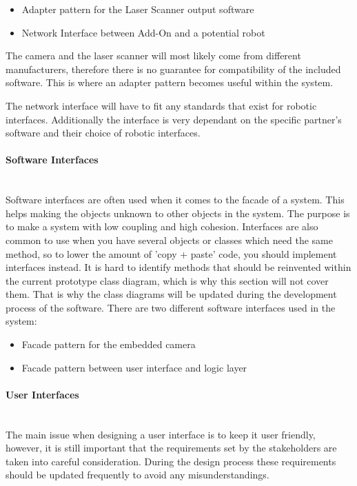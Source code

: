 \begin{itemize}

\item Adapter pattern for the Laser Scanner output software
\item Network Interface between Add-On and a potential robot

\end{itemize}

The camera and the laser scanner will most likely come from different manufacturers, therefore there is no guarantee for compatibility of the included software. This is where an adapter pattern becomes useful within the system.

The network interface will have to fit any standards that exist for robotic interfaces. Additionally the interface is very dependant on the specific partner's software and their choice of robotic interfaces.
\paragraph*{Software Interfaces}~\\
Software interfaces are often used when it comes to the facade of a system. This helps making the objects unknown to other objects in the system. The purpose is to make a system with low coupling and high cohesion. Interfaces are also common to use when you have several objects or classes which need the same method, so to lower the amount of 'copy + paste' code, you should implement interfaces instead. It is hard to identify methods that should be reinvented within the current prototype class diagram, which is why this section will not cover them. That is why the class diagrams will be updated during the development process of the software. There are two different software interfaces used in the system:

\begin{itemize}

\item Facade pattern for the embedded camera
\item Facade pattern between user interface and logic layer

\end{itemize}

\paragraph*{User Interfaces}~\\
The main issue when designing a user interface is to keep it user friendly, however, it is still important that the requirements set by the stakeholders are taken into careful consideration. During the design process these requirements should be updated frequently to avoid any misunderstandings.

